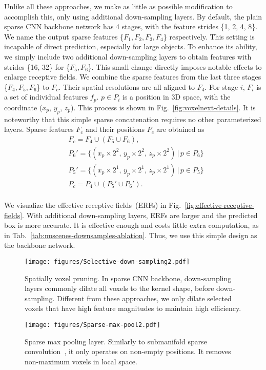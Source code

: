 \documentclass[10pt,twocolumn,letterpaper]{article}
\begin{document}
Unlike all these approaches, we make as little as possible modification to accomplish this, only using additional down-sampling layers. By default, the plain sparse CNN backbone network has 4 stages, with the feature strides \{1, 2, 4, 8\}. We name the output sparse features \{$F_1, F_2, F_3, F_4$\} respectively. This setting is incapable of direct prediction, especially for large objects. To enhance its ability, we simply include two additional down-sampling layers to obtain features with strides \{16, 32\} for \{$F_5, F_6$\}. This small change directly imposes notable effects to enlarge receptive fields. We combine the sparse features from the last three stages \{$F_4, F_5, F_6$\} to $F_c$. Their spatial resolutions are all aligned to $F_4$. For stage $i$, $F_i$ is a set of individual features $f_p$. $p\in P_i$ is a position in 3D space, with the coordinate ($x_p$, $y_p$, $z_p$). This process is shown in Fig.~\ref{fig:voxelnext-details}. It is noteworthy that this simple sparse concatenation requires no other parameterized layers. 
Sparse features $F_c$ and their positions $P_c$
are obtained as
\begin{equation}
\label{eq:combine}
\begin{aligned}
&{F}_{c}=F_4\cup(F_5\cup F_6),\qquad \\
&P_6' = \{(x_p \times 2^2, \, y_p \times 2^2, \, z_p \times 2^2) \,|\, p\in P_6\} \\
&P_5' = \{(x_p \times 2^1, \, y_p \times 2^1, \, z_p \times 2^1) \,|\, p\in P_5\} \\
&{P}_{c}=P_4\cup(P_5'\cup P_6').\qquad \\
\end{aligned}
\end{equation}

We visualize the effective receptive fields~(ERFs) in Fig.~\ref{fig:effective-receptive-fields}. With additional down-sampling layers, ERFs are larger and the predicted box is more accurate.
It is effective enough and costs little extra computation, as in Tab.~\ref{tab:nuscenes-downsamples-ablation}. Thus, we use this simple design as the backbone network.
\begin{figure}[t]
\begin{center}
   \texttt{[image: figures/Selective-down-sampling2.pdf]}
   \caption{Spatially voxel pruning. In sparse CNN backbone, down-sampling layers commonly dilate all voxels to the kernel shape, before down-sampling. Different from these approaches, we only dilate selected voxels that have high feature magnitudes to maintain high efficiency.}
   \label{fig:selective-down-sampling}
\end{center}
\end{figure}
\begin{figure}[t]
\begin{center}
   \texttt{[image: figures/Sparse-max-pool2.pdf]}
   \caption{Sparse max pooling layer. Similarly to submanifold sparse convolution~\cite{submanifold-sparse-conv-v2}, it only operates on non-empty positions. It removes non-maximum voxels in local space.}
   \label{fig:sparse-max-pooling}
\end{center}
\end{figure}
\end{document}
